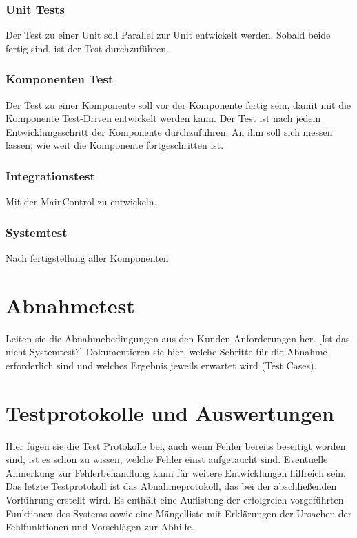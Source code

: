 \subsubsection{Unit Tests}
Der Test zu einer Unit soll Parallel zur Unit entwickelt werden. Sobald beide fertig sind, ist der Test durchzuführen.
\subsubsection{Komponenten Test}
Der Test zu einer Komponente soll vor der Komponente fertig sein, damit mit die Komponente Test-Driven entwickelt werden kann.
Der Test ist nach jedem Entwicklungsschritt der Komponente durchzuführen. An ihm soll sich messen lassen, wie weit die Komponente fortgeschritten ist.
\subsubsection{Integrationstest}
Mit der MainControl zu entwickeln.
\subsubsection {Systemtest}
Nach fertigstellung aller Komponenten.
\section{Abnahmetest}

Leiten sie die Abnahmebedingungen aus den Kunden-Anforderungen her. [Ist das nicht Systemtest?]
Dokumentieren sie hier, welche Schritte für die Abnahme erforderlich
sind und welches Ergebnis jeweils erwartet wird (Test Cases).

\section{Testprotokolle und Auswertungen}

Hier fügen sie die Test Protokolle bei, auch wenn Fehler bereits
beseitigt worden sind, ist es schön zu wissen, welche Fehler einst
aufgetaucht sind. Eventuelle Anmerkung zur Fehlerbehandlung kann für
weitere Entwicklungen hilfreich sein.
Das letzte Testprotokoll ist das Abnahmeprotokoll, das bei der
abschließenden Vorführung erstellt wird. Es enthält eine Auflistung der
erfolgreich vorgeführten Funktionen des Systems sowie eine Mängelliste
mit Erklärungen der Ursachen der Fehlfunktionen und Vorschlägen zur
Abhilfe.
